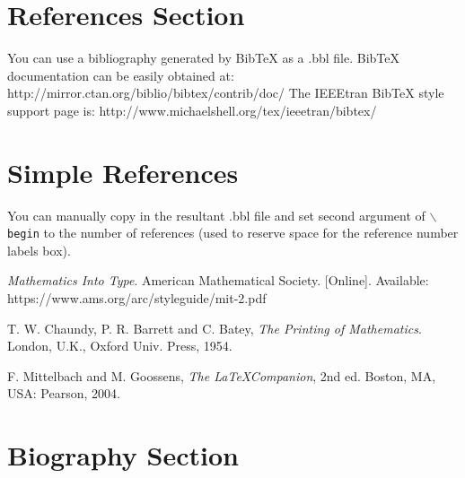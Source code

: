 \documentclass[lettersize,journal]{IEEEtran}
\begin{document}
\section{References Section}
You can use a bibliography generated by BibTeX as a .bbl file.
 BibTeX documentation can be easily obtained at:
 http://mirror.ctan.org/biblio/bibtex/contrib/doc/
 The IEEEtran BibTeX style support page is:
 http://www.michaelshell.org/tex/ieeetran/bibtex/

%
%
\section{Simple References}
You can manually copy in the resultant .bbl file and set second argument of $\backslash${\tt{begin}} to the number of references
 (used to reserve space for the reference number labels box).

\begin{thebibliography}{1}


{\it{Mathematics Into Type}}. American Mathematical Society. [Online]. Available: https://www.ams.org/arc/styleguide/mit-2.pdf

T. W. Chaundy, P. R. Barrett and C. Batey, {\it{The Printing of Mathematics}}. London, U.K., Oxford Univ. Press, 1954.

F. Mittelbach and M. Goossens, {\it{The \LaTeX Companion}}, 2nd ed. Boston, MA, USA: Pearson, 2004.

\end{thebibliography}


\newpage

\section{Biography Section}

\vspace{11pt}


\vspace{11pt}

\vfill
\end{document}
